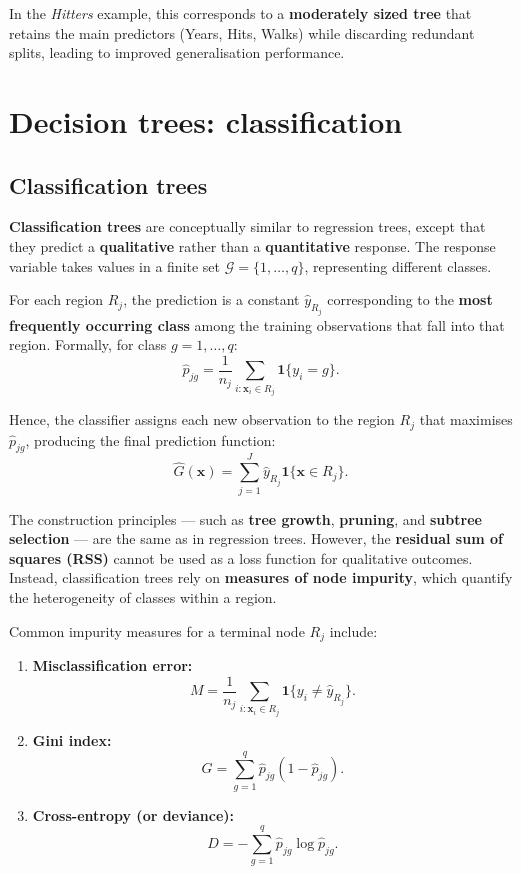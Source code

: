 \documentclass[
  letterpaper,
  DIV=11,
  numbers=noendperiod]{scrartcl}
\begin{document}
In the \emph{Hitters} example, this corresponds to a \textbf{moderately
sized tree} that retains the main predictors (Years, Hits, Walks) while
discarding redundant splits, leading to improved generalisation
performance.

\section{Decision trees:
classification}\label{decision-trees-classification}

\subsection{Classification trees}\label{classification-trees}

\textbf{Classification trees} are conceptually similar to regression
trees, except that they predict a \textbf{qualitative} rather than a
\textbf{quantitative} response. The response variable takes values in a
finite set \(\mathcal{G} = \{1, \ldots, q\}\), representing different
classes.

For each region \(R_j\), the prediction is a constant \(\hat{y}_{R_j}\)
corresponding to the \textbf{most frequently occurring class} among the
training observations that fall into that region. Formally, for class
\(g = 1, \ldots, q\):
\[\hat{p}_{jg} = \frac{1}{n_j} \sum_{i : \mathbf{x}_i \in R_j} \mathbf{1}\{y_i = g\}.\]

Hence, the classifier assigns each new observation to the region \(R_j\)
that maximises \(\hat{p}_{jg}\), producing the final prediction
function:
\[\hat{G}(\mathbf{x}) = \sum_{j=1}^{J} \hat{y}_{R_j} \mathbf{1}\{\mathbf{x} \in R_j\}.\]

The construction principles --- such as \textbf{tree growth},
\textbf{pruning}, and \textbf{subtree selection} --- are the same as in
regression trees. However, the \textbf{residual sum of squares (RSS)}
cannot be used as a loss function for qualitative outcomes. Instead,
classification trees rely on \textbf{measures of node impurity}, which
quantify the heterogeneity of classes within a region.

Common impurity measures for a terminal node \(R_j\) include:

\begin{enumerate}
\def\labelenumi{\arabic{enumi}.}
\item
  \textbf{Misclassification error:}
  \[M = \frac{1}{n_j} \sum_{i : \mathbf{x}_i \in R_j} \mathbf{1}\{y_i \ne \hat{y}_{R_j}\}.\]
\item
  \textbf{Gini index:}
  \[G = \sum_{g=1}^{q} \hat{p}_{jg} (1 - \hat{p}_{jg}).\]
\item
  \textbf{Cross-entropy (or deviance):}
  \[D = - \sum_{g=1}^{q} \hat{p}_{jg} \log \hat{p}_{jg}.\]
\end{enumerate}
\end{document}
